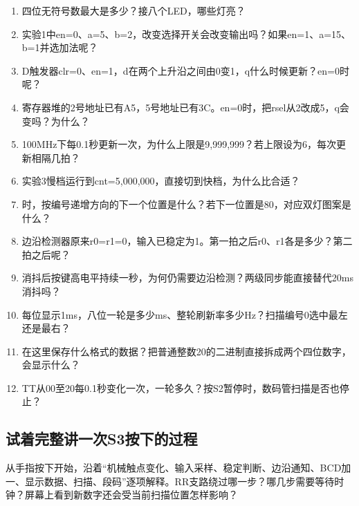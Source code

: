 \begin{enumerate}[label=\arabic*.]
\item 四位无符号数最大是多少？接八个LED，哪些灯亮？
\item 实验1中en=0、a=5、b=2，改变选择开关会改变输出吗？如果en=1、a=15、b=1并选加法呢？
\item D触发器clr=0、en=1，d在两个上升沿之间由0变1，q什么时候更新？en=0时呢？
\item 寄存器堆的2号地址已有A5，5号地址已有3C。en=0时，把rsel从2改成5，q会变吗？为什么？
\item 100MHz下每0.1秒更新一次，为什么上限是9,999,999？若上限设为6，每次更新相隔几拍？
\item 实验3慢档运行到cnt=5,000,000，直接切到快档，\code{>=}为什么比\code{==}合适？
\item {}时，按编号递增方向的下一个位置是什么？若下一位置是80，对应双灯图案是什么？
\item 边沿检测器原来r0=r1=0，输入已稳定为1。第一拍之后r0、r1各是多少？第二拍之后呢？
\item 消抖后按键高电平持续一秒，为何仍需要边沿检测？两级同步能直接替代20ms消抖吗？
\item 每位显示1ms，八位一轮是多少ms、整轮刷新率多少Hz？扫描编号0选中最左还是最右？
\item {}在这里保存什么格式的数据？把普通整数20的二进制直接拆成两个四位数字，会显示什么？
\item TT从00至20每0.1秒变化一次，一轮多久？按S2暂停时，数码管扫描是否也停止？
\end{enumerate}

\subsection{试着完整讲一次S3按下的过程}
从手指按下开始，沿着“机械触点变化、输入采样、稳定判断、边沿通知、BCD加一、显示数据、扫描、段码”逐项解释。RR支路绕过哪一步？哪几步需要等待时钟？屏幕上看到新数字还会受当前扫描位置怎样影响？


